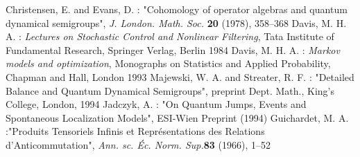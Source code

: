 \documentclass[12pt]{article}
\begin{document}
\begin{thebibliography}{99}
 Christensen,  E.  and Evans,  D. : "Cohomology of
operator algebras and quantum dynamical semigroups",  {\sl J.  London.
Math.  Soc. }  {\bf 20} (1978), 358--368
 Davis, M. H. A. : {\sl Lectures on Stochastic Control
and Nonlinear Filtering}, Tata Institute of Fundamental Research, Springer
Verlag, Berlin 1984
 Davis, M. H. A. : {\sl Markov models and optimization},
Monographs on Statistics and Applied Probability,  Chapman and Hall,
London 1993
 Majewski, W. A. and Streater, R. F. : "Detailed
Balance and Quantum Dynamical Semigroups", preprint Dept. Math., King's
College, London, 1994
 Jadczyk, A. : "On Quantum Jumps, Events and Spontaneous
Localization Models", ESI-Wien  Preprint (1994)
 Guichardet, M. A. :"Produits Tensoriels Infinis et
Repr\'esentations des Relations d'Anticommutation", {\sl Ann. sc. \'Ec.
Norm. Sup.}{\bf 83} (1966), 1--52
\end{thebibliography}
\end{document}
